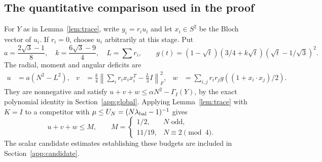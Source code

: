\subsection{The quantitative comparison used in the proof}
For $Y$ as in Lemma~\ref{lem:trace}, write $y_i=r_i u_i$ and let $x_i\in S^2$
be the Bloch vector of $u_i$. If $r_i=0$, choose $u_i$ arbitrarily at
this stage. Put
\[
 a=\frac{2\sqrt3-1}{8},\quad k=\frac{6\sqrt3-9}{4},\quad L=\sum r_i,
 \qquad g(t)=(1-\sqrt t)(3/4+k\sqrt t)(\sqrt t-1/\sqrt3)^2.
\]
The radial, moment and angular deficits are
\begin{align}\label{eq:deficits}
 u&=a(N^2-L^2),&
 v&=\frac k4\left\|\sum_i r_i x_ix_i^T-\frac L3I\right\|_F^2,&
 w&=\sum_{i,j}r_ir_jg((1+x_i\cdot x_j)/2).
\end{align}
They are nonnegative and satisfy
$u+v+w\le\alpha N^2-\Gamma_I(Y)$, by the exact polynomial identity
in Section~\ref{app:global}. Applying Lemma~\ref{lem:trace} with $K=I$
to a competitor with $\mu\le U_N=(N\lambda_{\rm bal}-1)^{-1}$ gives
\begin{equation}\label{eq:budget}
 u+v+w\le M,
 \qquad M=\begin{cases}1/2,&N\text{ odd},\\11/19,&N\equiv2\pmod4.
 \end{cases}
\end{equation}
The scalar candidate estimates establishing these budgets are included
in Section~\ref{app:candidate}.

